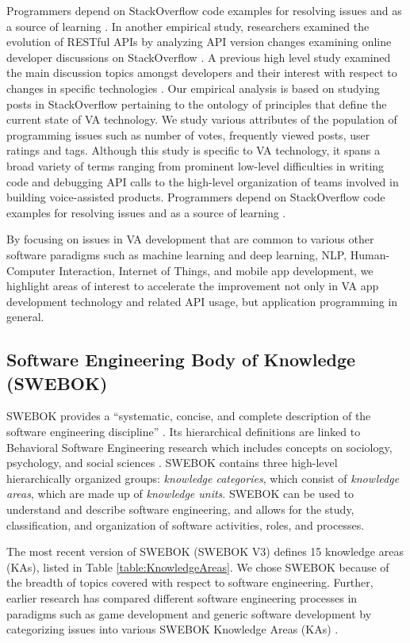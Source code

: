 \documentclass{sigchi}
\begin{document}
Programmers depend on StackOverflow code examples for resolving issues and as a source of learning \cite{Mehdi2012}. In another empirical study, researchers examined the evolution of RESTful APIs by analyzing API version changes examining online developer discussions on StackOverflow \cite{Wang2014}. A previous high level study examined the main discussion topics amongst developers and their interest with respect to changes in specific technologies \cite{Barua2014}.
Our empirical analysis is based on studying posts in StackOverflow pertaining to the ontology of principles that define the current state of VA technology. We study various attributes of the population of programming issues such as number of votes, frequently viewed posts, user ratings and tags. Although this study is specific to VA technology, it spans a broad variety of terms ranging from prominent low-level difficulties in writing code and debugging API calls to the high-level organization of teams involved in building voice-assisted products. Programmers depend on StackOverflow code examples for resolving issues and as a source of learning \cite{7nasehi2012makes}. 

By focusing on issues in VA development that are common to various other software paradigms such as machine learning and deep learning, NLP, Human-Computer Interaction, Internet of Things, and mobile app development, we highlight areas of interest to accelerate the improvement not only in VA app development technology and related API usage, but application programming in general.

\subsection{Software Engineering Body of Knowledge (SWEBOK)}
SWEBOK provides a ``systematic, concise, and complete description of the software engineering discipline'' \cite{2abran2001guide}. Its hierarchical definitions are linked to Behavioral Software Engineering research which includes concepts on sociology, psychology, and social sciences \cite{LENBERG201515}. SWEBOK contains three high-level hierarchically organized groups: \textit{knowledge categories}, which consist of \textit{knowledge areas}, which are made up of \textit{knowledge units}. SWEBOK can be used to understand and describe software engineering, and allows for the study, classification, and organization of software activities, roles, and processes. 

The most recent version of SWEBOK (SWEBOK V3) \cite{15bourque2014guide} defines 15 knowledge areas (KAs), listed in Table \ref{table:KnowledgeAreas}. We chose SWEBOK because of the breadth of topics covered with respect to software engineering. Further, earlier research has compared different software engineering processes in paradigms such as game development and generic software development by categorizing issues into various SWEBOK Knowledge Areas (KAs) \cite{1murphy2014cowboys}.
\end{document}
